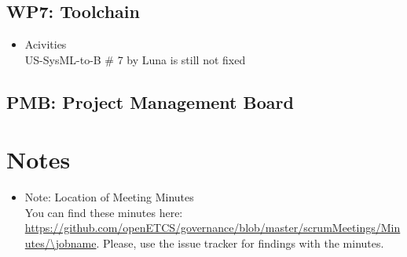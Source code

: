 \documentclass[a4paper, 11pt]{article}
\begin{document}
\subsection{WP7: Toolchain}

\begin{itemize}
\item Acivities\\
 US-SysML-to-B \# 7 by Luna is  still not fixed 
\end{itemize}

\subsection{PMB: Project Management Board}



\section{Notes}


\begin{itemize}

\item Note: Location of Meeting Minutes\\
You can find these minutes here: \url{https://github.com/openETCS/governance/blob/master/scrumMeetings/Minutes/\jobname}. Please, use the issue tracker for findings with the minutes.

\end{itemize}
\end{document}
